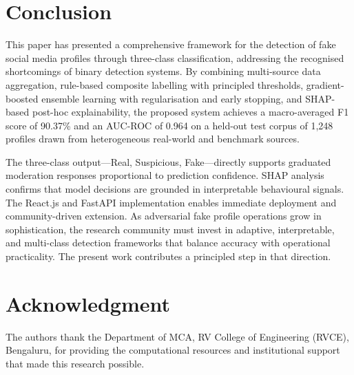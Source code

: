 \documentclass[conference]{IEEEtran}
\begin{document}
\section{Conclusion}
\label{sec:conclusion}

This paper has presented a comprehensive framework for the detection of
fake social media profiles through three-class classification, addressing
the recognised shortcomings of binary detection systems. By combining
multi-source data aggregation, rule-based composite labelling with
principled thresholds, gradient-boosted ensemble learning with
regularisation and early stopping, and SHAP-based post-hoc
explainability, the proposed system achieves a macro-averaged F1 score
of 90.37\% and an AUC-ROC of 0.964 on a held-out test corpus of 1,248
profiles drawn from heterogeneous real-world and benchmark sources.

The three-class output---Real, Suspicious, Fake---directly supports
graduated moderation responses proportional to prediction confidence.
SHAP analysis confirms that model decisions are grounded in interpretable
behavioural signals. The React.js and FastAPI implementation enables
immediate deployment and community-driven extension. As adversarial fake
profile operations grow in sophistication, the research community must
invest in adaptive, interpretable, and multi-class detection frameworks
that balance accuracy with operational practicality. The present work
contributes a principled step in that direction.

\section*{Acknowledgment}

The authors thank the Department of MCA, RV College of Engineering
(RVCE), Bengaluru, for providing the computational resources and
institutional support that made this research possible.
\end{document}
